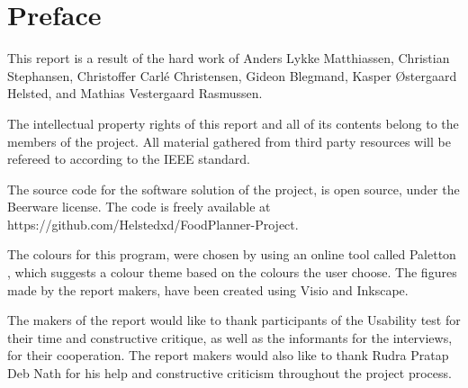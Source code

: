 \chapter*{Preface} \label{PrefaceLabel}

This report is a result of the hard work of Anders Lykke Matthiassen, Christian Stephansen, Christoffer Carlé Christensen, Gideon Blegmand, Kasper Østergaard Helsted, and Mathias Vestergaard Rasmussen.

The intellectual property rights of this report and all of its contents belong to the members of the project. All material gathered from third party resources will be refereed to according to the IEEE standard.

The source code for the software solution of the project, is open source, under the Beerware license. The code is freely available at https://github.com/Helstedxd/FoodPlanner-Project.

The colours for this program, were chosen by using an online tool called Paletton \cite{paletton}, which suggests a colour theme based on the colours the user choose. The figures made by the report makers, have been created using Visio and Inkscape. 

The makers of the report would like to thank participants of the Usability test for their time and constructive critique, as well as the informants for the interviews, for their cooperation. The report makers would also like to thank Rudra Pratap Deb Nath for his help and constructive criticism throughout the project process.

